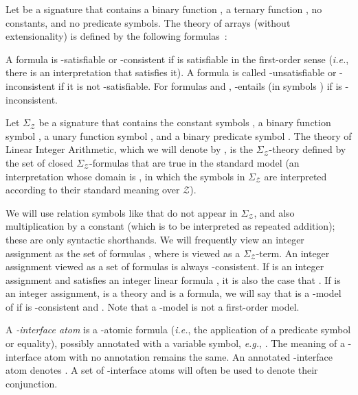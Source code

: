 \documentclass{llncs}
\newcommand{\comment}[1]{}
\newcommand{\ie}[0]{\emph{i.e.}, }
\newcommand{\eg}[0]{\emph{e.g.}, }
\newcommand{\Z}[0]{\ensuremath{\mathcal{Z}}}
\newcommand{\SigmaZ}[0]{\ensuremath{\Sigma_{\mathcal{Z}}}}
\begin{document}
\begin{example}
  Let  be a signature that contains a binary
  function , a ternary function , no constants, and
  no predicate symbols. The theory  of arrays
  (without extensionality) is defined by the following
  formulas~\cite{mc62}:
  
\end{example}

A formula  is -satisfiable or -consistent if  is
satisfiable in the first-order sense (\ie there is an interpretation
that satisfies it). A formula  is called -unsatisfiable or
-inconsistent if it is not -satisfiable. For formulas  and
,  -entails  (in symbols ) if  is -inconsistent.

\begin{definition}
  Let \SigmaZ{} be a signature that contains the constant symbols    , a binary function symbol , a unary
  function symbol , and a binary predicate symbol . The
  theory of Linear Integer Arithmetic, which we will denote by ,
  is the \SigmaZ{}-theory defined by the set of closed
  \SigmaZ{}-formulas that are true in the standard model (an
  interpretation whose domain is , in which the symbols in
  \SigmaZ{} are interpreted according to their standard meaning over
  \Z{}).
\end{definition}

We will use relation symbols like  that do not appear in \SigmaZ{},
and also multiplication by a constant (which is to be interpreted as
repeated addition); these are only syntactic shorthands. We will
frequently view an integer assignment  as the set of formulas
, where  is viewed as a
\SigmaZ{}-term. An integer assignment  viewed as a set of formulas
is always -consistent. If  is an integer assignment and 
satisfies an integer linear formula , it is also the case that .  If  is an integer assignment,  is a theory and 
is a formula, we will say that  is a -model of  if  is
-consistent and . Note that a -model is not a
first-order model.

\comment{Whenever convenient, we will be viewing first-order models as
  integer assignments; this is possible, because for every first-order
  model  of \Z{} and for every variable symbol , there is a
  unique integer constant  such that .}

A \emph{-interface atom} is a -atomic formula (\ie the
application of a predicate symbol or equality), possibly annotated
with a variable symbol, \eg . The meaning of a
-interface atom with no annotation remains the same. An
annotated -interface atom  denotes . A set of -interface atoms will often
be used to denote their conjunction. \comment{We will assume that for
  every interface atom of the form  or  where ,
  , and  are variable symbols, at most one of  and 
  appears in integer linear constraints; the opposite would defy the
  purpose of interface atoms.}
\end{document}
